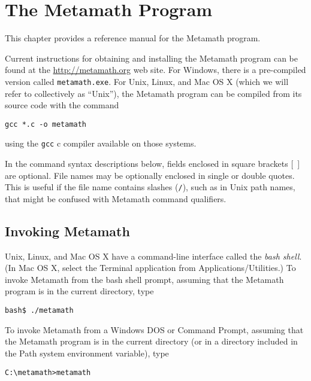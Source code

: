 \chapter{The Metamath Program}\label{commands}

This chapter provides a reference manual for the
Metamath program.

Current instructions for obtaining and installing the Metamath program
can be found at the \url{http://metamath.org} web site.
For Windows, there is a pre-compiled version called
\texttt{metamath.exe}.  For Unix, Linux, and Mac OS X
(which we will refer to collectively as ``Unix''), the Metamath program
can be compiled from its source code with the command
\begin{verbatim}
gcc *.c -o metamath
\end{verbatim}
using the \texttt{gcc} {\sc c} compiler available on those systems.

In the command syntax descriptions below, fields enclosed in square
brackets [\ ] are optional.  File names may be optionally enclosed in
single or double quotes.  This is useful if the file name contains
slashes (\texttt{/}), such as in Unix path names,  that might be confused with Metamath
command qualifiers.

\section{Invoking Metamath}

Unix, Linux, and Mac OS X
have a command-line interface called the {\em
bash shell}.  (In Mac OS X, select the Terminal application from
Applications/Utilities.)  To invoke Metamath from the bash shell prompt,
assuming that the Metamath program is in the current directory, type
\begin{verbatim}
bash$ ./metamath
\end{verbatim}

To invoke Metamath from a Windows DOS or Command Prompt, assuming that
the Metamath program is in the current directory (or in a directory
included in the Path system environment variable), type
\begin{verbatim}
C:\metamath>metamath
\end{verbatim}

